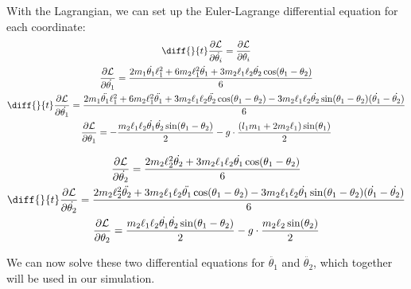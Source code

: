 \documentclass[]{article}
\begin{document}
With the Lagrangian, we can set up the Euler-Lagrange differential equation for each coordinate:
\begin{gather*}
	\diff{}{t}\frac{\partial \lagr}{\partial \dot{\theta_i}} = \frac{\partial \lagr}{\partial \theta_i} \\
	\frac{\partial \lagr}{\partial \dot{\theta_1}} = \frac{2m_1\dot{\theta_1}\ell_1^2 + 6m_2\ell_1^2\dot{\theta_1} + 3m_2\ell_1\ell_2\dot{\theta_2}\cos(\theta_1 - \theta_2)}{6} \\
	\diff{}{t}\frac{\partial \lagr}{\partial \dot{\theta_1}} =  \frac{2m_1\ddot{\theta_1}\ell_1^2 + 6m_2\ell_1^2\ddot{\theta_1} + 3m_2\ell_1\ell_2\ddot{\theta_2}\cos(\theta_1 - \theta_2) - 3m_2\ell_1\ell_2\dot{\theta_2}\sin(\theta_1 - \theta_2)(\dot{\theta_1} - \dot{\theta_2})}{6} \\
	\frac{\partial \lagr}{\partial \theta_1} = -\frac{m_2\ell_1\ell_2\dot{\theta_1}\dot{\theta_2}\sin(\theta_1 - \theta_2)}{2} - g\cdot\frac{(l_1m_1 + 2m_2\ell_1)\sin(\theta_1)}{2} \\
\end{gather*}

\begin{gather*}
	\frac{\partial \lagr}{\partial \dot{\theta_2}} = \frac{2m_2\ell_2^2\dot{\theta_2} + 3m_2\ell_1\ell_2\dot{\theta_1}\cos(\theta_1 - \theta_2)}{6} \\
	\diff{}{t}\frac{\partial \lagr}{\partial \dot{\theta_2}} = \frac{2m_2\ell_2^2\ddot{\theta_2} + 3m_2\ell_1\ell_2\ddot{\theta_1}\cos(\theta_1 - \theta_2) - 3m_2\ell_1\ell_2\dot{\theta_1}\sin(\theta_1 - \theta_2)(\dot{\theta_1} - \dot{\theta_2})}{6} \\
	\frac{\partial \lagr}{\partial \theta_2} = \frac{m_2\ell_1\ell_2\dot{\theta_1}\dot{\theta_2}\sin(\theta_1 - \theta_2)}{2} - g\cdot\frac{m_2\ell_2\sin(\theta_2)}{2}
\end{gather*}

We can now solve these two differential equations for $\ddot{\theta_1}$ and $\ddot{\theta_2}$, which together will be used in our simulation.
\end{document}
